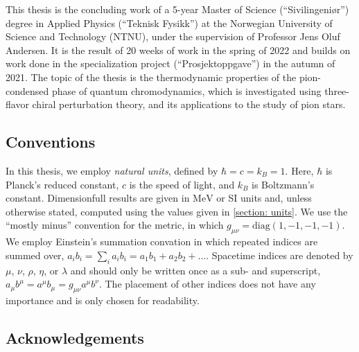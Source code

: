 This thesis is the concluding work of a 5-year Master of Science (``Sivilingeniør'') degree in Applied Physics (``Teknisk Fysikk'') at the Norwegian University of Science and Technology (NTNU), under the supervision of Professor Jens Oluf Andersen.
It is the result of 20 weeks of work in the spring of 2022 and builds on work done in the specialization project (``Prosjektoppgave'') in the autumn of 2021.
The topic of the thesis is the thermodynamic properties of the pion-condensed phase of quantum chromodynamics, which is investigated using three-flavor chiral perturbation theory, and its applications to the study of pion stars.

\subsection*{Conventions}

In this thesis, we employ \emph{natural units}, defined by $\hbar = c = k_B = 1$.
Here, $\hbar$ is Planck's reduced constant, $c$ is the speed of light, and $k_B$ is Boltzmann's constant.
Dimensionfull results are given in $\text{MeV}$ or SI units and, unless otherwise stated, computed using the values given in \autoref{section: units}.
We use the ``mostly minus'' convention for the metric, in which $g_{\mu \nu} = \text{diag}(1, -1, -1, -1)$.
We employ Einstein's summation convation in which repeated indices are summed over, $a_i b_i = {\sum}_i a_i b_i = a_1 b_1 +  a_2 b_2 +\dots$.
Spacetime indices are denoted by $\mu$, $\nu$, $\rho$, $\eta$, or $\lambda$ and should only be written once as a sub- and superscript, $a_\mu b^\mu = a^\mu b_\mu = g_{\mu\nu}a^\mu b^\nu$.
The placement of other indices does not have any importance and is only chosen for readability.


\subsection*{Acknowledgements}



{}
